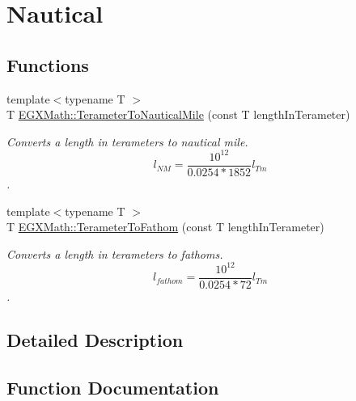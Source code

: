 \hypertarget{group___e_g_x_math-_conversions-_length_conversions-_s_i-_terameter-_nautical}{}\section{Nautical}
\label{group___e_g_x_math-_conversions-_length_conversions-_s_i-_terameter-_nautical}
\subsection*{Functions}
\begin{DoxyCompactItemize}
\item 
{\footnotesize template$<$typename T $>$ }\\T \mbox{\hyperlink{group___e_g_x_math-_conversions-_length_conversions-_s_i-_terameter-_nautical_ga6a799ea329334a189c2ed5a898a238af}{E\+G\+X\+Math\+::\+Terameter\+To\+Nautical\+Mile}} (const T length\+In\+Terameter)
\begin{DoxyCompactList}\small\item\em Converts a length in terameters to nautical mile. \[ l_{NM}= \frac{10^{12}}{0.0254 * 1852} l_{Tm} \]. \end{DoxyCompactList}\item 
{\footnotesize template$<$typename T $>$ }\\T \mbox{\hyperlink{group___e_g_x_math-_conversions-_length_conversions-_s_i-_terameter-_nautical_gaef70a960ef5e91001f3ff2bfeb0d96bf}{E\+G\+X\+Math\+::\+Terameter\+To\+Fathom}} (const T length\+In\+Terameter)
\begin{DoxyCompactList}\small\item\em Converts a length in terameters to fathoms. \[ l_{fathom}= \frac{10^{12}}{0.0254 * 72} l_{Tm} \]. \end{DoxyCompactList}\end{DoxyCompactItemize}


\subsection{Detailed Description}


\subsection{Function Documentation}
\mbox{\label{group___e_g_x_math-_conversions-_length_conversions-_s_i-_terameter-_nautical_gaef70a960ef5e91001f3ff2bfeb0d96bf}} 
